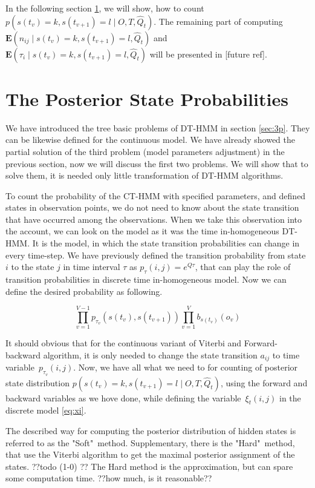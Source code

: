 \documentclass[thesis=M,english]{FITthesis}[2012/10/20]
\begin{document}
In the following section \ref{sec:pos}, we will show, how to count $p(s(t_v) = k,s(t_{v+1}) = l \mid O,T, \hat Q_t)$. The remaining part of computing $\mathbf{E}(n_{ij} \mid s(t_v) = k,s(t_{v+1}) = l,\hat Q_t )$ and $\mathbf{E}(\tau_i \mid s(t_v) = k,s(t_{v+1}) = l,\hat Q_t )$ will be presented in [future ref]. 

\section{The Posterior State Probabilities}\label{sec:pos}

We have introduced the tree basic problems of DT-HMM in section \ref{sec:3p}. They can be likewise defined for the continuous model. We have already showed the partial solution of the third problem (model parameters adjustment) in the previous section, now we will discuss the first two problems. We will show that to solve them, it is needed only little transformation of DT-HMM algorithms.

To count the probability of the CT-HMM with specified parameters, and defined states in observation points, we do not need to know about the state transition that have occurred among the observations.
When we take this observation into the account, we can look on the model as it was the time in-homogeneous DT-HMM. It is the model, in which the state transition probabilities can change in every time-step. We have previously defined the transition probability from state $i$ to the state $j$ in time interval $\tau$ as $p_{\tau}(i,j) = e^{Q \tau}$, that can play the role of transition probabilities in discrete time in-homogeneous model. Now we can define the desired probability as following.

\begin{equation}
\prod_{v=1}^{V-1} p_{\tau_v}(s(t_v),s(t_{v+1})) \prod_{v=1}^{V} b_{s(t_v)}(o_v)
\end{equation}

It should obvious that for the continuous variant of Viterbi and Forward-backward algorithm, it is only needed to change the state transition $a_{ij}$ to time variable~$p_{\tau_v}(i,j)$.   
Now, we have all what we need to for counting of posterior state distribution $p(s(t_v) = k,s(t_{v+1}) = l \mid O,T, \hat Q_t)$, using the forward and backward variables as we hove done, while defining the variable~$\xi_t(i,j)$ in the discrete model \eqref{eq:xi}.

The described way for computing the posterior distribution of hidden states is referred to as the "Soft"~method. Supplementary, there is the "Hard"~method, that use the Viterbi algorithm to get the maximal posterior assignment of the states. ??todo (1-0) ??  The Hard method is the approximation, but can spare some computation time. ??how much, is it reasonable??           
    
\end{document}
